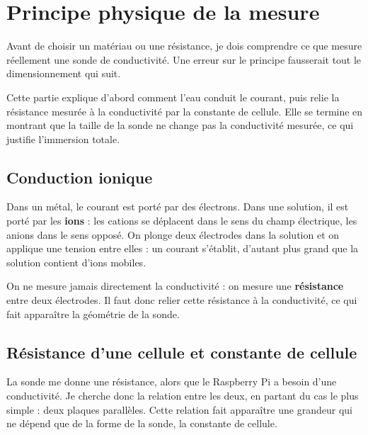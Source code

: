\documentclass[11pt,a4paper]{article}
\begin{document}
\newpage
\section{Principe physique de la mesure}
\label{sec:principe}

Avant de choisir un matériau ou une résistance, je dois comprendre ce que mesure réellement une sonde de conductivité. Une erreur sur le principe fausserait tout le dimensionnement qui suit.

Cette partie explique d'abord comment l'eau conduit le courant, puis relie la résistance mesurée à la conductivité par la constante de cellule. Elle se termine en montrant que la taille de la sonde ne change pas la conductivité mesurée, ce qui justifie l'immersion totale.


\subsection{Conduction ionique}

Dans un métal, le courant est porté par des électrons. Dans une solution, il est porté par les \textbf{ions} : les cations se déplacent dans le sens du champ électrique, les anions dans le sens opposé. On plonge deux électrodes dans la solution et on applique une tension entre elles : un courant s'établit, d'autant plus grand que la solution contient d'ions mobiles.

On ne mesure jamais directement la conductivité : on mesure une \textbf{résistance} entre deux électrodes. Il faut donc relier cette résistance à la conductivité, ce qui fait apparaître la géométrie de la sonde.

\subsection{Résistance d'une cellule et constante de cellule}

La sonde me donne une résistance, alors que le Raspberry Pi a besoin d'une conductivité. Je cherche donc la relation entre les deux, en partant du cas le plus simple : deux plaques parallèles. Cette relation fait apparaître une grandeur qui ne dépend que de la forme de la sonde, la constante de cellule.
\end{document}
